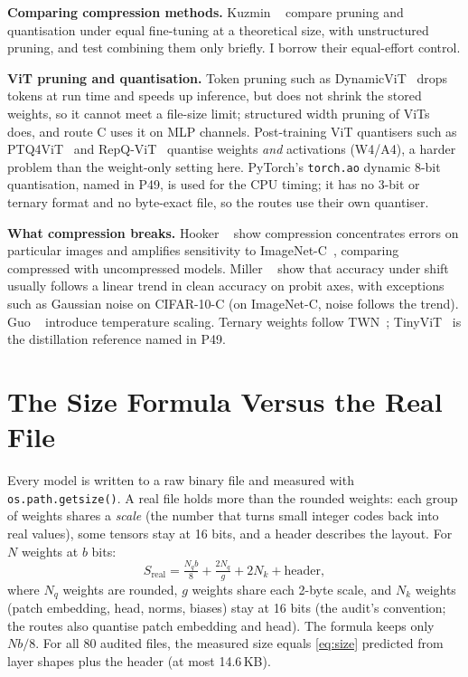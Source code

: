 \documentclass[10pt,twocolumn,letterpaper]{article}
\begin{document}
\textbf{Comparing compression methods.} Kuzmin \etal~\cite{kuzmin2023pruning} compare pruning and quantisation under equal fine-tuning at a theoretical size, with unstructured pruning, and test combining them only briefly. I borrow their equal-effort control.

\textbf{ViT pruning and quantisation.} Token pruning such as DynamicViT~\cite{rao2021dynamicvit} drops tokens at run time and speeds up inference, but does not shrink the stored weights, so it cannot meet a file-size limit; structured width pruning of ViTs~\cite{yu2022width} does, and route C uses it on MLP channels. Post-training ViT quantisers such as PTQ4ViT~\cite{yuan2022ptq4vit} and RepQ-ViT~\cite{li2023repqvit} quantise weights \emph{and} activations (\eg W4/A4), a harder problem than the weight-only setting here. PyTorch's \texttt{torch.ao} dynamic 8-bit quantisation, named in P49, is used for the CPU timing; it has no 3-bit or ternary format and no byte-exact file, so the routes use their own quantiser.

\textbf{What compression breaks.} Hooker \etal~\cite{hooker2019forget} show compression concentrates errors on particular images and amplifies sensitivity to ImageNet-C~\cite{hendrycks2019benchmarking}, comparing compressed with uncompressed models. Miller \etal~\cite{miller2021line} show that accuracy under shift usually follows a linear trend in clean accuracy on probit axes, with exceptions such as Gaussian noise on CIFAR-10-C (on ImageNet-C, noise follows the trend). Guo \etal~\cite{guo2017calibration} introduce temperature scaling. Ternary weights follow TWN~\cite{li2016ternary}; TinyViT~\cite{wu2022tinyvit} is the distillation reference named in P49.

\section{The Size Formula Versus the Real File}
\label{sec:size}
Every model is written to a raw binary file and measured with \texttt{os.path.getsize()}. A real file holds more than the rounded weights: each group of weights shares a \emph{scale} (the number that turns small integer codes back into real values), some tensors stay at 16 bits, and a header describes the layout. For $N$ weights at $b$ bits:
\begin{equation}
S_{\text{real}} = \tfrac{N_q b}{8} + \tfrac{2 N_q}{g} + 2N_k + \text{header},
\label{eq:size}
\end{equation}
where $N_q$ weights are rounded, $g$ weights share each 2-byte scale, and $N_k$ weights (patch embedding, head, norms, biases) stay at 16 bits (the audit's convention; the routes also quantise patch embedding and head). The formula keeps only $N b/8$. For all 80 audited files, the measured size equals \cref{eq:size} predicted from layer shapes plus the header (at most 14.6\,KB).
\end{document}
